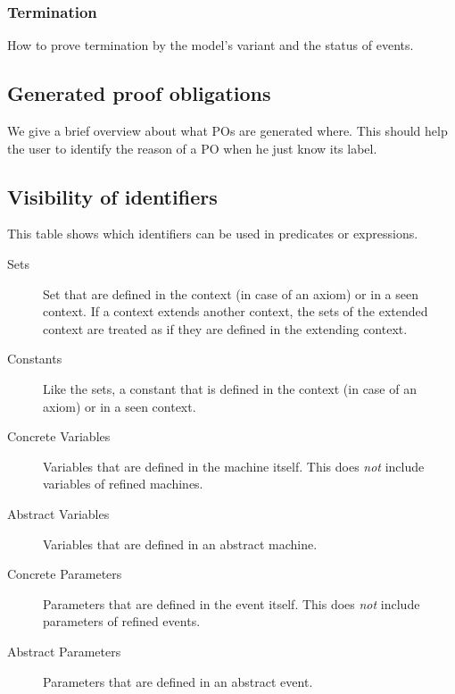 \subsubsection{Termination}
\label{termination}



How to prove termination by the model's variant and the status of events.
  
\subsection{Generated proof obligations}

We give a brief overview about what POs are generated where. This should help the user to identify the reason of a PO when he just know its label.


\subsection{Visibility of identifiers}
\label{visibility_of_identifiers}

This table shows which identifiers can be used in predicates or expressions. 
\begin{description}
\item[Sets] Set that are defined in the context (in case of an axiom) or in a seen context.
  If a context extends another context, the sets of the extended context are treated as if they
  are defined in the extending context.
\item[Constants] Like the sets, a constant that is defined in the context (in case of an axiom) or
  in a seen context.
\item[Concrete Variables] Variables that are defined in the machine itself. This does \emph{not}
  include variables of refined machines.
\item[Abstract Variables] Variables that are defined in an abstract machine.
\item[Concrete Parameters] Parameters that are defined in the event itself. This does \emph{not}
  include parameters of refined events.
\item[Abstract Parameters] Parameters that are defined in an abstract event.
\end{description}


